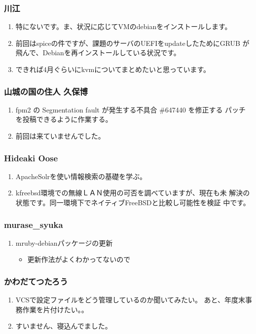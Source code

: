 \documentclass[cjk,dvipdfmx,10pt,compress,%
hyperref={bookmarks=true,bookmarksnumbered=true,bookmarksopen=false,%
colorlinks=false,%
pdftitle={第 82 回 関西 Debian 勉強会},%
pdfauthor={倉敷・のがた・佐々木・かわだ・八津尾},%
pdfsubject={資料},%
}]{beamer}
\begin{document}
\begin{frame}
  \frametitle{ 川江 }
  \begin{enumerate}
  \item 特にないです。ま、状況に応じてVMのdebianをインストールします。
  \item 前回はspiceの件ですが、課題のサーバのUEFIをupdateしたためにGRUB
    が飛んで、Debianを再インストールしている状況です。
  \item できれば4月ぐらいにkvmについてまとめたいと思っています。
  \end{enumerate}
\end{frame}

\begin{frame}
  \frametitle{ 山城の国の住人 久保博 }
  \begin{enumerate}
  \item fpm2 の Segmentation fault が発生する不具合 \#647440 を修正する
    パッチを投稿できるように作業する。
  \item 前回は来ていませんでした。
  \end{enumerate}
\end{frame}

\begin{frame}
  \frametitle{ Hideaki Oose }
  \begin{enumerate}
  \item ApacheSolrを使い情報検索の基礎を学ぶ。
  \item kfreebsd環境での無線ＬＡＮ使用の可否を調べていますが、現在も未
    解決の状態です。同一環境下でネイティブFreeBSDと比較し可能性を検証
    中です。
  \end{enumerate}
\end{frame}

\begin{frame}
  \frametitle{ murase\_{}syuka }
  \begin{enumerate}
  \item mruby-debianパッケージの更新
    \begin{itemize}
    \item 更新作法がよくわかってないので
    \end{itemize}
  \end{enumerate}
\end{frame}

\begin{frame}
  \frametitle{ かわだてつたろう }
  \begin{enumerate}
  \item VCSで設定ファイルをどう管理しているのか聞いてみたい。
    あと、年度末事務作業を片付けたい。。
  \item すいません、寝込んでました。
  \end{enumerate}
\end{frame}
\end{document}
